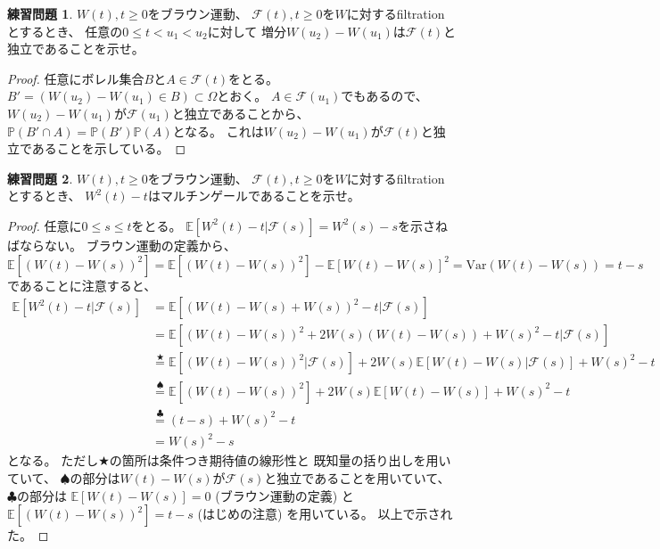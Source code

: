 \documentclass[uplatex]{jsarticle}
\theoremstyle{definition}
\newtheorem{prob}[prob]{練習問題}
\def\P{\mathbb{P}}
\def\E{\mathbb{E}}
\def\mcF{\mathcal{F}}
\newcommand{\Var}{\mathrm{Var}}
\begin{document}
\begin{prob}\label{prob: 3.1}
  \(W(t) , t\geq 0\)をブラウン運動、
  \(\mcF(t) , t\geq 0\)を\(W\)に対するfiltrationとするとき、
  任意の\(0\leq t < u_1 < u_2\)に対して
  増分\(W(u_2)-W(u_1)\)は\(\mcF(t)\)と独立であることを示せ。
\end{prob}

\begin{proof}
  任意にボレル集合\(B\)と\(A\in \mcF(t)\)をとる。
  \(B' = (W(u_2)-W(u_1)\in B)\subset \Omega\)とおく。
  \(A\in \mcF(u_1)\)でもあるので、
  \(W(u_2)-W(u_1)\)が\(\mcF(u_1)\)と独立であることから、
  \(\P(B'\cap A) = \P(B')\P(A)\)となる。
  これは\(W(u_2)-W(u_1)\)が\(\mcF(t)\)と独立であることを示している。
\end{proof}





\begin{prob}\label{prob: 3.2}
  \(W(t), t\geq 0\)をブラウン運動、
  \(\mcF(t) , t\geq 0\)を\(W\)に対するfiltrationとするとき、
  \(W^2(t) - t\)はマルチンゲールであることを示せ。
\end{prob}

\begin{proof}
  任意に\(0\leq s \leq t\)をとる。
  \(\E[W^2(t) - t|\mcF(s)] = W^2(s)-s\)を示さねばならない。
  ブラウン運動の定義から、
  \[
  \E[(W(t)-W(s))^2] = \E[(W(t)-W(s))^2] - \E[W(t)-W(s)]^2
  = \Var(W(t)-W(s)) = t-s
  \]
  であることに注意すると、
  \begin{align*}
    \E[W^2(t) - t|\mcF(s)]
    &= \E[(W(t)-W(s) + W(s))^2 - t | \mcF(s)] \\
    &= \E[(W(t)-W(s))^2 + 2W(s)(W(t)-W(s)) + W(s)^2 - t | \mcF(s)] \\
    &\overset{\bigstar}{=}
    \E[(W(t)-W(s))^2|\mcF(s)]
    + 2W(s)\E[W(t)-W(s)|\mcF(s)] + W(s)^2 - t \\
    &\overset{\spadesuit}{=} \E[(W(t)-W(s))^2]
    + 2W(s)\E[W(t)-W(s)] + W(s)^2 - t \\
    &\overset{\clubsuit}{=} (t-s) + W(s)^2 - t \\
    &= W(s)^2 - s
  \end{align*}
  となる。
  ただし\(\bigstar\)の箇所は条件つき期待値の線形性と
  既知量の括り出しを用いていて、
  \(\spadesuit\)の部分は\(W(t)-W(s)\)が\(\mcF(s)\)と独立であることを用いていて、
  \(\clubsuit\)の部分は
  \(\E[W(t)-W(s)] = 0\) (ブラウン運動の定義) と
  \(\E[(W(t)-W(s))^2] = t-s\) (はじめの注意) を用いている。
  以上で示された。
\end{proof}
\end{document}
